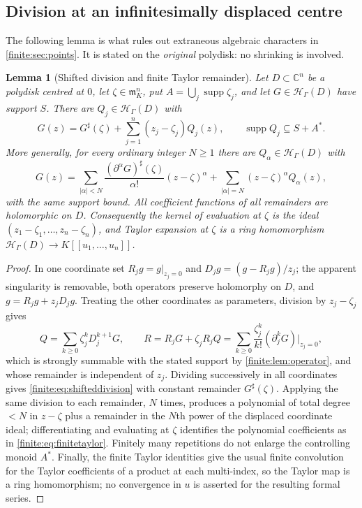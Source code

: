 \documentclass[11pt,letterpaper]{article}
\newtheorem{lemma}[theorem]{Lemma}
\theoremstyle{definition}
\theoremstyle{remark}
\newcommand{\C}{\mathbb C}
\newcommand{\HH}{\mathscr H}
\newcommand{\mm}{\mathfrak m}
\newcommand{\sh}{^{\sharp}}
\DeclareMathOperator{\supp}{supp}
\numberwithin{equation}{section}
\begin{document}
\subsection{Division at an infinitesimally displaced centre}
\label{finite:sec:shifted}

The following lemma is what rules out extraneous algebraic characters in \cref{finite:sec:points}. It is stated on the \emph{original} polydisk: no shrinking is involved.

\begin{lemma}[Shifted division and finite Taylor remainder]
\label{finite:lem:shifted}
Let $D\subset\C^n$ be a polydisk centred at $0$, let $\zeta\in\mm_K^n$, put $A=\bigcup_j\supp\zeta_j$, and let $G\in\HH_\Gamma(D)$ have support $S$. There are $Q_j\in\HH_\Gamma(D)$ with
\begin{equation}\label{finite:eq:shifteddivision}
 G(z)=G\sh(\zeta)+\sum_{j=1}^n(z_j-\zeta_j)Q_j(z),
 \qquad \supp Q_j\subseteq S+A^*.
\end{equation}
More generally, for every ordinary integer $N\geq1$ there are $Q_\alpha\in\HH_\Gamma(D)$ with
\begin{equation}\label{finite:eq:finitetaylor}
 G(z)=\sum_{|\alpha|<N}
 \frac{(\partial^\alpha G)\sh(\zeta)}{\alpha!}(z-\zeta)^\alpha
 +\sum_{|\alpha|=N}(z-\zeta)^\alpha Q_\alpha(z),
\end{equation}
with the same support bound. All coefficient functions of all remainders are holomorphic on $D$. Consequently the kernel of evaluation at $\zeta$ is the ideal $(z_1-\zeta_1,\ldots,z_n-\zeta_n)$, and Taylor expansion at $\zeta$ is a ring homomorphism $\HH_\Gamma(D)\to K[[u_1,\ldots,u_n]]$.
\end{lemma}

\begin{proof}
In one coordinate set $R_jg=g|_{z_j=0}$ and $D_jg=(g-R_jg)/z_j$; the apparent singularity is removable, both operators preserve holomorphy on $D$, and $g=R_jg+z_jD_jg$. Treating the other coordinates as parameters, division by $z_j-\zeta_j$ gives
\[
 Q=\sum_{k\geq0}\zeta_j^kD_j^{k+1}G,
 \qquad
 R=R_jG+\zeta_jR_jQ=\sum_{k\geq0}\frac{\zeta_j^k}{k!}(\partial_j^kG)|_{z_j=0},
\]
which is strongly summable with the stated support by \cref{finite:lem:operator}, and whose remainder is independent of $z_j$. Dividing successively in all coordinates gives \eqref{finite:eq:shifteddivision} with constant remainder $G\sh(\zeta)$. Applying the same division to each remainder, $N$ times, produces a polynomial of total degree $<N$ in $z-\zeta$ plus a remainder in the $N$th power of the displaced coordinate ideal; differentiating and evaluating at $\zeta$ identifies the polynomial coefficients as in \eqref{finite:eq:finitetaylor}. Finitely many repetitions do not enlarge the controlling monoid $A^*$. Finally, the finite Taylor identities give the usual finite convolution for the Taylor coefficients of a product at each multi-index, so the Taylor map is a ring homomorphism; no convergence in $u$ is asserted for the resulting formal series.
\end{proof}
\end{document}
